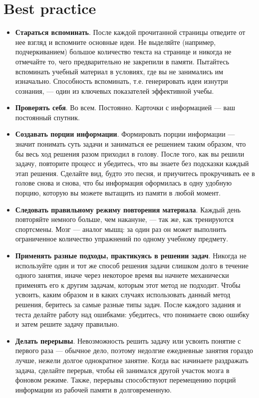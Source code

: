 \documentclass{article}
\begin{document}
\section{Best practice}
\begin{itemize}
\item \textbf{Стараться вспоминать}. После каждой прочитанной страницы отведите от нее взгляд и вспомните основные идеи. Не выделяйте (например, подчеркиванием) большое количество текста на странице и никогда не отмечайте то, чего предварительно не закрепили в памяти. Пытайтесь вспоминать учебный материал в условиях, где вы не занимались им изначально. Способность вспоминать, т.е. генерировать идеи изнутри сознания, --- один из ключевых показателей эффективной учебы.
\item \textbf{Проверять себя}. Во всем. Постоянно. Карточки с информацией --- ваш постоянный спутник.
\item \textbf{Создавать порции информации}. Формировать порции информации --- значит понимать суть задачи и заниматься ее решением таким образом, что бы весь ход решения разом приходил в голову. После того, как вы решили задачу, повторите процесс и убедитесь, что вы знаете без подсказки каждый этап решения. Сделайте вид, будто это песня, и приучитесь прокручивать ее в голове снова и снова, что бы информация оформилась в одну удобную порцию, которую вы можете вытащить из памяти в любой момент.
\item \textbf{Следовать правильному режиму повторения материала}. Каждый день повторяйте немного больше, чем накануне, --- так же, как тренируются спортсмены. Мозг --- аналог мышц: за один раз он может выполнить ограниченное количество упражнений по одному учебному предмету.
\item \textbf{Применять разные подходы, практикуясь в решении задач}. Никогда не используйте один и тот же способ решения задачи слишком долго в течение одного занятия, иначе через некоторое время вы начнете механически применять его к другим задачам, которым этот метод не подходит. Чтобы усвоить, каким образом и в каких случаях использовать данный метод решения, беритесь за самые разные типы задач. После каждого задания и теста делайте работу над ошибками: убедитесь, что понимаете свою ошибку и затем решите задачу правильно.
\item \textbf{Делать перерывы}. Невозможность решить задачу или усвоить понятие с первого раза --- обычное дело, поэтому недолгие ежедневные занятия гораздо лучше, нежели долгое однократное занятие. Когда вас начинаете раздражать задача, сделайте перерыв, чтобы ей занимался другой участок мозга в фоновом режиме. Также, перерывы способствуют перемещению порций информации из рабочей памяти в долговременную.

\end{itemize}
\end{document}
